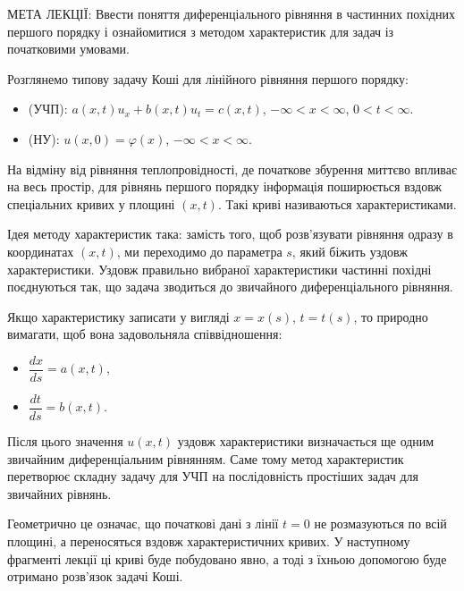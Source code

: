\documentclass[
  ukrainian,
]{article}
\providecommand{\tightlist}{%
  \setlength{\itemsep}{0pt}\setlength{\parskip}{0pt}}
\begin{document}
МЕТА ЛЕКЦІЇ: Ввести поняття диференціального рівняння в частинних
похідних першого порядку і ознайомитися з методом характеристик для
задач із початковими умовами.

Розглянемо типову задачу Коші для лінійного рівняння першого порядку:

\begin{itemize}
\tightlist
\item
  (УЧП): \(a(x,t)u_x + b(x,t)u_t = c(x,t)\), \(-\infty < x < \infty\),
  \(0 < t < \infty\).
\item
  (НУ): \(u(x,0) = \varphi(x)\), \(-\infty < x < \infty\).
\end{itemize}

На відміну від рівняння теплопровідності, де початкове збурення миттєво
впливає на весь простір, для рівнянь першого порядку інформація
поширюється вздовж спеціальних кривих у площині \((x,t)\). Такі криві
називаються характеристиками.

Ідея методу характеристик така: замість того, щоб розв'язувати рівняння
одразу в координатах \((x,t)\), ми переходимо до параметра \(s\), який
біжить уздовж характеристики. Уздовж правильно вибраної характеристики
частинні похідні поєднуються так, що задача зводиться до звичайного
диференціального рівняння.

Якщо характеристику записати у вигляді \(x=x(s)\), \(t=t(s)\), то
природно вимагати, щоб вона задовольняла співвідношення:

\begin{itemize}
\tightlist
\item
  \(\dfrac{dx}{ds} = a(x,t)\),
\item
  \(\dfrac{dt}{ds} = b(x,t)\).
\end{itemize}

Після цього значення \(u(x,t)\) уздовж характеристики визначається ще
одним звичайним диференціальним рівнянням. Саме тому метод характеристик
перетворює складну задачу для УЧП на послідовність простіших задач для
звичайних рівнянь.

Геометрично це означає, що початкові дані з лінії \(t=0\) не
розмазуються по всій площині, а переносяться вздовж характеристичних
кривих. У наступному фрагменті лекції ці криві буде побудовано явно, а
тоді з їхньою допомогою буде отримано розв'язок задачі Коші.
\end{document}
